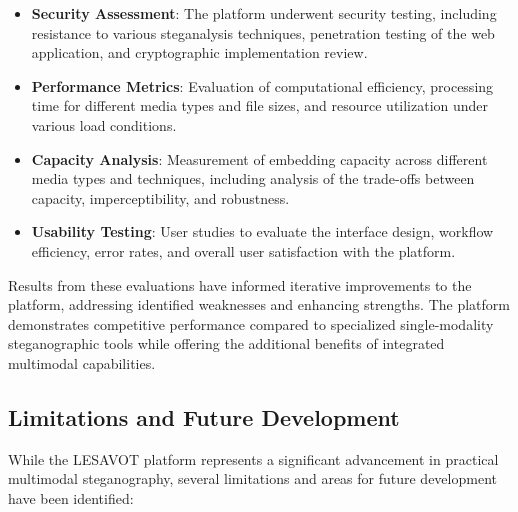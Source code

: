 \documentclass[12pt, a4paper, oneside]{book}
\begin{document}
\begin{itemize}[leftmargin=*]
    \item \textbf{Security Assessment}: The platform underwent security testing, including resistance to various steganalysis techniques, penetration testing of the web application, and cryptographic implementation review.

    \item \textbf{Performance Metrics}: Evaluation of computational efficiency, processing time for different media types and file sizes, and resource utilization under various load conditions.

    \item \textbf{Capacity Analysis}: Measurement of embedding capacity across different media types and techniques, including analysis of the trade-offs between capacity, imperceptibility, and robustness.

    \item \textbf{Usability Testing}: User studies to evaluate the interface design, workflow efficiency, error rates, and overall user satisfaction with the platform.
\end{itemize}

Results from these evaluations have informed iterative improvements to the platform, addressing identified weaknesses and enhancing strengths. The platform demonstrates competitive performance compared to specialized single-modality steganographic tools while offering the additional benefits of integrated multimodal capabilities.

\subsection{Limitations and Future Development}
While the LESAVOT platform represents a significant advancement in practical multimodal steganography, several limitations and areas for future development have been identified:
\end{document}
